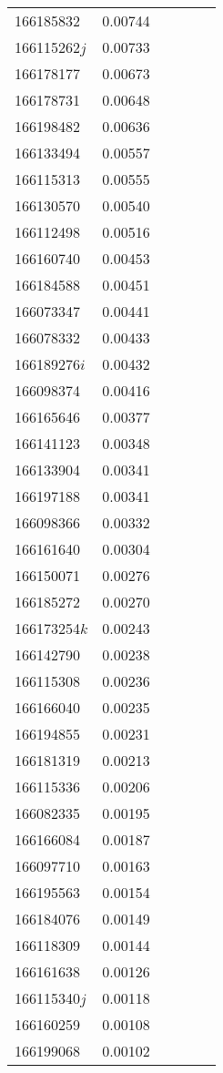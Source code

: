 \begin{landscape}
\begin{longtable}{p{1.8cm}p{0.9cm}p{2.2cm}p{1cm}p{2.8cm}p{13.4cm}}
166185832&0.00744&&&& \\
166115262$j$&0.00733&&&& \\
166178177&0.00673&&&& \\
166178731&0.00648&&&& \\
166198482&0.00636&&&& \\
166133494&0.00557&&&& \\
166115313&0.00555&&&& \\
166130570&0.00540&&&& \\
166112498&0.00516&&&& \\
166160740&0.00453&&&& \\
166184588&0.00451&&&& \\
166073347&0.00441&&&& \\
166078332&0.00433&&&& \\
166189276$i$&0.00432&&&& \\
166098374&0.00416&&&& \\
166165646&0.00377&&&& \\
166141123&0.00348&&&& \\
166133904&0.00341&&&& \\
166197188&0.00341&&&& \\
166098366&0.00332&&&& \\
166161640&0.00304&&&& \\
166150071&0.00276&&&& \\
166185272&0.00270&&&& \\
166173254$k$&0.00243&&&& \\
166142790&0.00238&&&& \\
166115308&0.00236&&&& \\
166166040&0.00235&&&& \\
166194855&0.00231&&&& \\
166181319&0.00213&&&& \\
166115336&0.00206&&&& \\
166082335&0.00195&&&& \\
166166084&0.00187&&&& \\
166097710&0.00163&&&& \\
166195563&0.00154&&&& \\
166184076&0.00149&&&& \\
166118309&0.00144&&&& \\
166161638&0.00126&&&& \\
166115340$j$&0.00118&&&& \\
166160259&0.00108&&&& \\
166199068&0.00102&&&& \\

\end{longtable}
\end{landscape}
